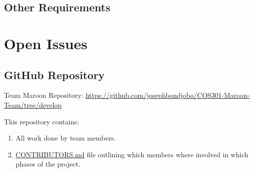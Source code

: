 \documentclass[a4paper,10pt]{article}
\begin{document}
	\subsection{Other Requirements}

\clearpage
\section{Open Issues}
\subsection {GitHub Repository}
Team Maroon Repository: \url{https://github.com/josephbondjobo/COS301-Maroon-Team/tree/develop}

This repository contains:
\begin{enumerate}
\item All work done by team members.
\item \href{https://github.com/josephbondjobo/COS301-Maroon-Team/blob/develop/Intro/Contributors.md}{CONTRIBUTORS.md} file outlining which members where involved in which phases of the project.
\end{enumerate}



\newpage
\clearpage
{}
\end{document}
